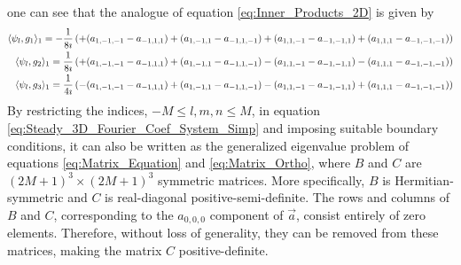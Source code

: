 \documentclass{article}
\newcommand{\0}{\mathbf{0}}
\newcommand{\1}{\mathbf{1}}
\newcommand{\2}{\mathbf{2}}
\newcommand{\3}{\mathbf{3}}
\newcommand{\4}{\mathbf{4}}
\newcommand{\5}{\mathbf{5}}
\newcommand{\6}{\mathbf{6}}
\newcommand{\7}{\mathbf{7}}
\newcommand{\8}{\mathbf{8}}
\begin{document}
one can see that the analogue of equation \eqref{eq:Inner_Products_2D}
is given by 
%
\begin{align}\label{eq:Inner_Products_3D}
  \langle\psi_l,g_1\rangle_1=-\frac{1}{8\imath}&\left( +(a_{1,-1,-1}-a_{-1,1,1})
                              +(a_{1,-1,1}-a_{-1,1,-1})
                              +(a_{1,1,-1}-a_{-1,-1,1})
                              +(a_{1,1,1}-a_{-1,-1,-1})
  \right)               
              \notag\\
  \langle\psi_l,g_2\rangle_1=\frac{1}{8\imath}&\left( +(a_{1,-1,-1}-a_{-1,1,1})
                             +(a_{1,-1,1}-a_{-1,1,-1})
                             -(a_{1,1,-1}-a_{-1,-1,1})
                             -(a_{1,1,1}-a_{-1,-1,-1})
  \right)               
               \notag\\
  \langle\psi_l,g_3\rangle_1=\frac{1}{4\imath}&\left( -(a_{1,-1,-1}-a_{-1,1,1})
                             +(a_{1,-1,1}-a_{-1,1,-1})
                             -(a_{1,1,-1}-a_{-1,-1,1})
                             +(a_{1,1,1}-a_{-1,-1,-1})
  \right)               
\end{align}
%
By restricting the indices, $-M\leq l,m,n\leq M$, in equation
\eqref{eq:Steady_3D_Fourier_Coef_System_Simp} and imposing suitable
boundary conditions, it can also be written as the generalized
eigenvalue problem of equations \eqref{eq:Matrix_Equation} and
\eqref{eq:Matrix_Ortho}, where  $B$ and $C$ are $(2M+1)^3\times(2M+1)^3$
symmetric matrices. More specifically, $B$ is Hermitian-symmetric and
$C$ is real-diagonal positive-semi-definite. The rows and
columns of $B$ and $C$, corresponding to the $a_{0,0,0}$ component of
$\vec{a}$, consist entirely of zero elements. Therefore, without loss
of generality, they can be removed from these matrices, making the
matrix $C$ positive-definite.
%
\end{document}
